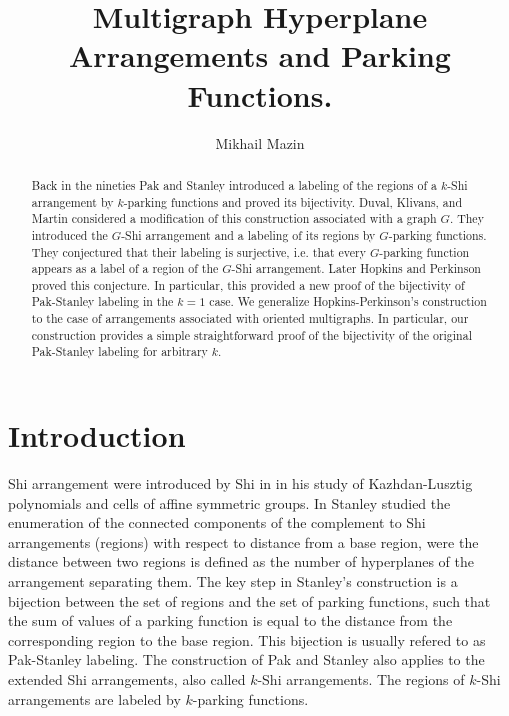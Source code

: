 \documentclass[12pt]{amsart}
\theoremstyle{definition}
\begin{document}
\author{Mikhail Mazin}
\address{Mathematics Department, Kansas State University.
Cardwell Hall, Manhattan, KS 66506}
\title{Multigraph Hyperplane Arrangements and Parking Functions.}
\date{}

\begin{abstract}
Back in the nineties Pak and Stanley introduced a labeling of the regions of a $k$-Shi arrangement by $k$-parking functions and proved its bijectivity. Duval, Klivans, and Martin considered a modification of this construction associated with a graph $G.$ They introduced the $G$-Shi arrangement and a labeling of its regions by $G$-parking functions. They conjectured that their labeling is surjective, i.e. that every $G$-parking function appears as a label of a region of the $G$-Shi arrangement. Later Hopkins and Perkinson proved this conjecture. In particular, this provided a new proof of the bijectivity of Pak-Stanley labeling in the $k=1$ case. We generalize Hopkins-Perkinson's construction to the case of arrangements associated with oriented multigraphs. In particular, our construction provides a simple straightforward proof of the bijectivity of the original Pak-Stanley labeling for arbitrary $k.$


\end{abstract}



\maketitle

\section*{Introduction}

Shi arrangement were introduced by Shi in \cite{Sh86} in his study of Kazhdan-Lusztig polynomials and cells of affine symmetric groups. In \cite{St98} Stanley studied the enumeration of the connected components of the complement to Shi arrangements (regions) with respect to distance from a base region, were the distance between two regions is defined as the number of hyperplanes of the arrangement separating them. The key step in Stanley's construction is a bijection between the set of regions and the set of parking functions, such that the sum of values of a parking function is equal to the distance from the corresponding region to the base region. This bijection is usually refered to as Pak-Stanley labeling. The construction of Pak and Stanley also applies to the extended Shi arrangements, also called $k$-Shi arrangements. The regions of $k$-Shi arrangements are labeled by $k$-parking functions.
\end{document}
